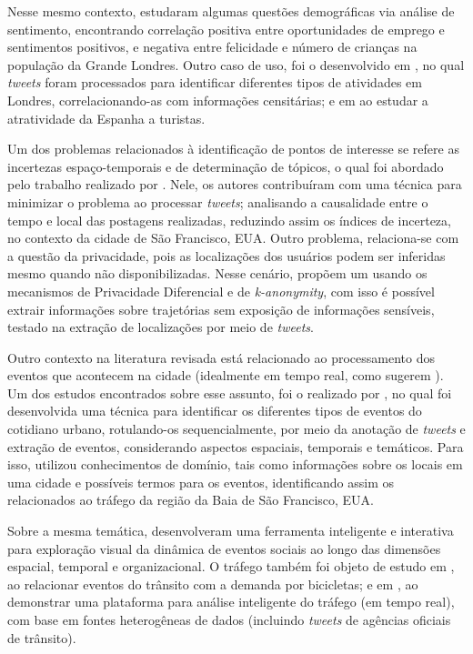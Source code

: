 \documentclass[
	12pt,				%
	oneside,			%
	a4paper,			%
	english,			%
	brazil				%
	]{abntex2ppgsi}
\begin{document}
Nesse mesmo contexto, \cite{Guo2016} estudaram algumas questões demográficas via análise de sentimento, encontrando correlação positiva entre oportunidades de emprego e sentimentos positivos, e negativa entre felicidade e número de crianças na população da Grande Londres. Outro caso de uso, foi o desenvolvido em \cite{Steiger2015Census}, no qual \textit{tweets} foram processados para identificar diferentes tipos de atividades em Londres, correlacionando-as com informações censitárias; e em \cite{Sobolevsky2015} ao estudar a atratividade da Espanha a turistas.

Um dos problemas relacionados à identificação de pontos de interesse se refere as incertezas espaço-temporais e de determinação de tópicos, o qual foi abordado pelo trabalho realizado por \cite{Bendler2014}. Nele, os autores contribuíram com uma técnica para minimizar o problema ao processar \textit{tweets}; analisando a causalidade entre o tempo e local das postagens realizadas, reduzindo assim os índices de incerteza, no contexto da cidade de São Francisco, EUA. Outro problema, relaciona-se com a questão da privacidade, pois as localizações dos usuários podem ser inferidas mesmo quando não disponibilizadas. Nesse cenário, \cite{Wang2017} propõem um  usando os mecanismos de Privacidade Diferencial e de \textit{k-anonymity}, com isso é possível extrair informações sobre trajetórias sem exposição de informações sensíveis, testado na extração de localizações por meio de \textit{tweets}. 

Outro contexto na literatura revisada está relacionado ao processamento dos eventos que acontecem na cidade (idealmente em tempo real, como sugerem \cite{Soomro2016}). Um dos estudos encontrados sobre esse assunto, foi o realizado por \cite{Anantharam2015}, no qual foi desenvolvida uma técnica para identificar os diferentes tipos de eventos do cotidiano urbano, rotulando-os sequencialmente, por meio da anotação de \textit{tweets} e extração de eventos, considerando aspectos espaciais, temporais e temáticos. Para isso, utilizou conhecimentos de domínio, tais como informações sobre os locais em uma cidade e possíveis termos para os eventos, identificando assim os relacionados ao tráfego da região da Baia de São Francisco, EUA. 

Sobre a mesma temática, \cite{DiLorenzo2013} desenvolveram uma ferramenta inteligente e interativa para exploração visual da dinâmica de eventos sociais ao longo das dimensões espacial, temporal e organizacional. O tráfego também foi objeto de estudo em \cite{Chen2016}, ao relacionar eventos do trânsito com a demanda por bicicletas; e em \cite{Lecue2014}, ao demonstrar uma plataforma para análise inteligente do tráfego (em tempo real), com base em fontes heterogêneas de dados (incluindo \textit{tweets} de agências oficiais de trânsito).
\end{document}
